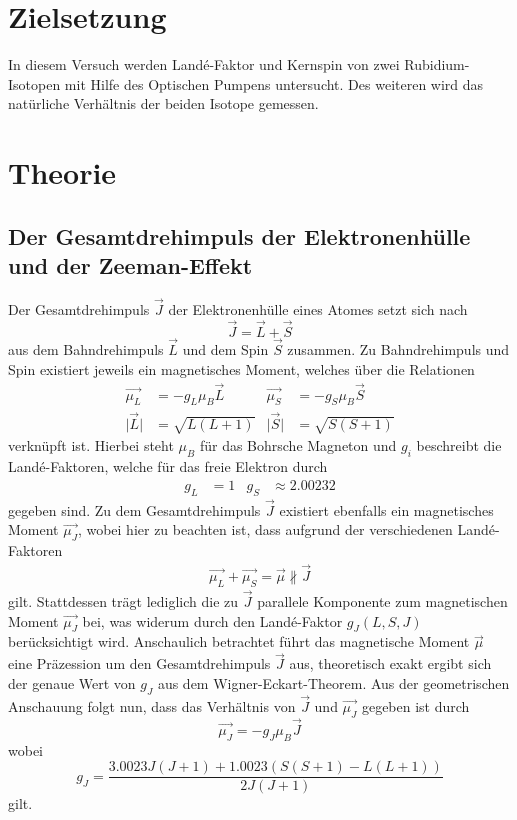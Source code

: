 \section{Zielsetzung}
In diesem Versuch werden Land\'{e}-Faktor und Kernspin von zwei Rubidium-Isotopen mit Hilfe des Optischen Pumpens untersucht.
Des weiteren wird das natürliche Verhältnis der beiden Isotope gemessen.

\section{Theorie}
\label{sec:Theorie}

\subsection{Der Gesamtdrehimpuls der Elektronenhülle und der Zeeman-Effekt}
Der Gesamtdrehimpuls $\vec{J}$ der Elektronenhülle eines Atomes setzt sich nach
\begin{equation}
  \vec{J} = \vec{L} + \vec{S}
\end{equation}
aus dem Bahndrehimpuls $\vec{L}$ und dem Spin $\vec{S}$ zusammen.
Zu Bahndrehimpuls und Spin existiert jeweils ein magnetisches Moment, welches über die Relationen
\begin{align}
  \vec{\mu_L} &= - g_L \mu_B \vec{L} & \vec{\mu_S} &= - g_S \mu_B \vec{S} \\
  \lvert \vec{L} \rvert &= \sqrt{L(L+1)} & \lvert \vec{S} \rvert &= \sqrt{S(S+1)}
\end{align}
verknüpft ist.
Hierbei steht $\mu_B$ für das Bohrsche Magneton und $g_i$ beschreibt die Land\'{e}-Faktoren, welche für das freie Elektron durch
\begin{align}
  \label{eqn:5}
  g_L &= 1 & g_S &\approx \num{2.00232}
\end{align}
gegeben sind.
Zu dem Gesamtdrehimpuls $\vec{J}$ existiert ebenfalls ein magnetisches Moment $\vec{\mu_J}$, wobei hier zu beachten ist, dass aufgrund der verschiedenen Land\'{e}-Faktoren
\begin{align*}
  \vec{\mu_L} + \vec{\mu_S} = \vec{\mu} \nparallel \vec{J}
\end{align*}
gilt.
Stattdessen trägt lediglich die zu $\vec{J}$ parallele Komponente zum magnetischen Moment $\vec{\mu_J}$ bei, was widerum durch den Land\'{e}-Faktor $g_J(L, S, J)$ berücksichtigt wird.
Anschaulich betrachtet führt das magnetische Moment $\vec{\mu}$ eine Präzession um den Gesamtdrehimpuls $\vec{J}$ aus, theoretisch exakt ergibt sich der genaue Wert von $g_J$ aus dem Wigner-Eckart-Theorem.
Aus der geometrischen Anschauung folgt nun, dass das Verhältnis von $\vec{J}$ und $\vec{\mu_J}$ gegeben ist durch
\begin{equation}
  \vec{\mu_J} = - g_J \mu_B \vec{J}
\end{equation}
wobei
\begin{equation}
  g_J = \frac{ \num{3.0023} J \left(J+1\right) + \num{1.0023} \left( S \left( S+1 \right) - L \left(L+1\right) \right) }{ 2 J \left(J+1\right) }
\end{equation}
gilt. \\

